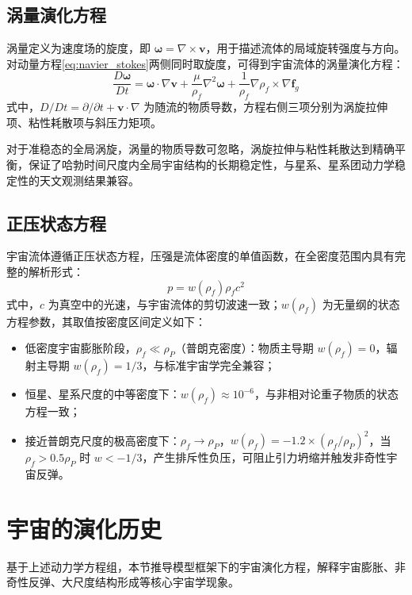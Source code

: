 \documentclass[aps,prd,preprint,superscriptaddress,floatfix]{revtex4-2}
\begin{document}
\subsection{涡量演化方程}
涡量定义为速度场的旋度，即 $\boldsymbol{\omega}=\nabla \times \boldsymbol{v}$，用于描述流体的局域旋转强度与方向。对动量方程\eqref{eq:navier_stokes}两侧同时取旋度，可得到宇宙流体的涡量演化方程：
\begin{equation}
\frac{D \boldsymbol{\omega}}{D t}=\boldsymbol{\omega} \cdot \nabla \boldsymbol{v}+\frac{\mu}{\rho_{f}} \nabla^{2} \boldsymbol{\omega}+\frac{1}{\rho_{f}} \nabla \rho_{f} \times \nabla \boldsymbol{f}_{g}
\label{eq:vorticity}
\end{equation}
式中，$D / D t=\partial / \partial t+\boldsymbol{v} \cdot \nabla$ 为随流的物质导数，方程右侧三项分别为涡旋拉伸项、粘性耗散项与斜压力矩项。

对于准稳态的全局涡旋，涡量的物质导数可忽略，涡旋拉伸与粘性耗散达到精确平衡，保证了哈勃时间尺度内全局宇宙结构的长期稳定性，与星系、星系团动力学稳定性的天文观测结果兼容。

\subsection{正压状态方程}
宇宙流体遵循正压状态方程，压强是流体密度的单值函数，在全密度范围内具有完整的解析形式：
\begin{equation}
p=w\left(\rho_{f}\right) \rho_{f} c^{2}
\label{eq:eos}
\end{equation}
式中，$c$ 为真空中的光速，与宇宙流体的剪切波速一致；$w(\rho_{f})$ 为无量纲的状态方程参数，其取值按密度区间定义如下：
\begin{itemize}
    \item 低密度宇宙膨胀阶段，$\rho_{f} \ll \rho_{P}$（普朗克密度）：物质主导期 $w(\rho_{f})=0$，辐射主导期 $w(\rho_{f})=1/3$，与标准宇宙学完全兼容；
    \item 恒星、星系尺度的中等密度下：$w(\rho_{f}) \approx 10^{-6}$，与非相对论重子物质的状态方程一致；
    \item 接近普朗克尺度的极高密度下：$\rho_{f} \to \rho_{P}$，$w(\rho_{f})=-1.2 \times(\rho_{f} / \rho_{P})^{2}$，当 $\rho_{f}>0.5 \rho_{P}$ 时 $w<-1/3$，产生排斥性负压，可阻止引力坍缩并触发非奇性宇宙反弹。
\end{itemize}

\section{宇宙的演化历史}
基于上述动力学方程组，本节推导模型框架下的宇宙演化方程，解释宇宙膨胀、非奇性反弹、大尺度结构形成等核心宇宙学现象。
\end{document}
